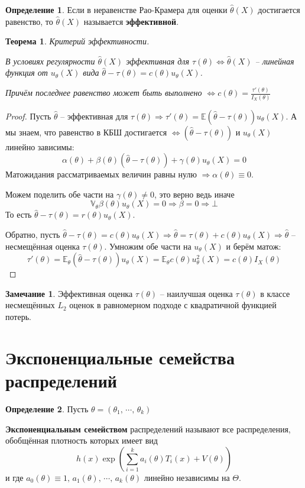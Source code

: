 \documentclass[a4paper,12pt]{article}
\theoremstyle{plain}
\newtheorem{theorem}{Теорема}[section]
\theoremstyle{definition}
\newtheorem{definition}{Определение}[section]
\newtheorem*{note}{Замечание}
\theoremstyle{remark}
\begin{document}
\begin{definition}
  Если в неравенстве Рао-Крамера для оценки $\hat{\theta}(X)$ достигается равенство, то $\hat{\theta}(X)$ называется \textbf{эффективной}.
\end{definition}

\begin{theorem}
  Критерий эффективности.

  В условиях регулярности $\hat{\theta}(X)$ эффективная для $\tau(\theta) \Leftrightarrow \hat{\theta}(X)$ -- линейная функция от $u_\theta(X)$ вида $\hat{\theta} - \tau(\theta) = c(\theta)u_\theta(X)$.

  Причём последнее равенство может быть выполнено $\Leftrightarrow c(\theta) = \frac{\tau'(\theta)}{I_X(\theta)}$
\end{theorem}

\begin{proof}
  Пусть $\hat{\theta}$ -- эффективная для $\tau(\theta) \Rightarrow \tau'(\theta) = \mathbb{E}(\hat{\theta} - \tau(\theta))u_\theta(X)$. А мы знаем, что равенство в КБШ достигается $\Leftrightarrow (\hat{\theta} - \tau(\theta))$ и $u_\theta(X)$ линейно зависимы:
  \[
    \alpha(\theta) + \beta(\theta)(\hat{\theta} - \tau(\theta)) + \gamma(\theta)u_\theta(X) = 0
  \]
  Матожидания рассматриваемых величин равны нулю $\Rightarrow \alpha(\theta) \equiv 0$.

  Можем поделить обе части на $\gamma(\theta) \neq 0$, это верно ведь иначе
  \[
    \mathbb{V}_\theta\beta(\theta)u_\theta(X) = 0 \Rightarrow \beta = 0 \Rightarrow\bot
  \]
  То есть $\hat{\theta} - \tau(\theta) = r(\theta)u_\theta(X)$.

  Обратно, пусть $\hat{\theta} - \tau(\theta) = c(\theta)u_\theta(X) \Rightarrow \hat{\theta} = \tau(\theta) + c(\theta)u_\theta(X) \Rightarrow \hat{\theta}$ -- несмещённая оценка $\tau(\theta)$. Умножим обе части на $u_\theta(X)$ и берём матож:
  \[
    \tau'(\theta) = \mathbb{E}_\theta(\hat{\theta} - \tau(\theta))u_\theta(X) = \mathbb{E}_\theta c(\theta)u^2_\theta(X) = c(\theta)I_X(\theta)
  \]
\end{proof}

\begin{note}
  Эффективная оценка $\tau(\theta)$ -- наилучшая оценка $\tau(\theta)$ в классе несмещённых $L_2$ оценок в равномерном подходе с квадратичной функцией потерь.
\end{note}

\section{Экспоненциальные семейства распределений}
\begin{definition}
  Пусть $\theta = (\theta_1,\,\cdots,\,\theta_k)$

  \textbf{Экспоненциальным семейством} распределений называют все распределения, обобщённая плотность которых имеет вид
  \[
    h(x)\exp\left(\sum_{i = 1}^ka_i(\theta)T_i(x) + V(\theta)\right)
  \]
  и где $a_0(\theta) \equiv 1,\, a_1(\theta),\,\cdots,\,a_k(\theta)$ линейно независимы на $\Theta$.
\end{definition}
\end{document}
